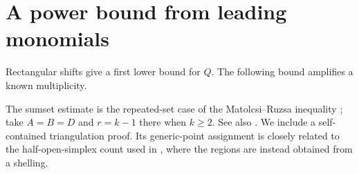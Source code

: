 \section{A power bound from leading monomials}\label{sec:lower}

Rectangular shifts give a first lower bound for \(Q\). The following
bound amplifies a known multiplicity.

The sumset estimate is the repeated-set case of the Matolcsi--Ruzsa
inequality \cite[preprint, Theorem~1.5]{MatolcsiRuzsa2010};
take \(A=B=D\) and \(r=k-1\) there when \(k\ge2\).
See also \cite[author version, Corollary~2]{BoroczkySantosSerra2014}.
We include a self-contained triangulation proof. Its generic-point
assignment is closely related to the half-open-simplex count used in
\cite[author version, Theorem~20]{BoroczkySantosSerra2014}, where the
regions are instead obtained from a shelling.

